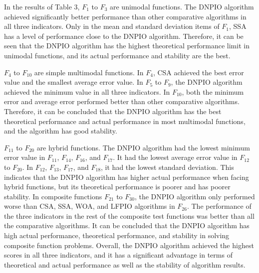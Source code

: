 \documentclass[preprint,review,compress,12pt]{elsarticle}
\begin{document}
In the results of Table 3, $F_1$ to $F_3$ are unimodal functions. The DNPIO algorithm achieved significantly better performance than other comparative algorithms in all three indicators. Only in the mean and standard deviation items of $F_1$, SSA has a level of performance close to the DNPIO algorithm. Therefore, it can be seen that the DNPIO algorithm has the highest theoretical performance limit in unimodal functions, and its actual performance and stability are the best.

$F_4$ to $F_{10}$ are simple multimodal functions. In $F_4$, CSA achieved the best error value and the smallest average error value. In $F_5$ to $F_9$, the DNPIO algorithm achieved the minimum value in all three indicators. In $F_{10}$, both the minimum error and average error performed better than other comparative algorithms. Therefore, it can be concluded that the DNPIO algorithm has the best theoretical performance and actual performance in most multimodal functions, and the algorithm has good stability.

$F_{11}$ to $F_{20}$ are hybrid functions. The DNPIO algorithm had the lowest minimum error value in $F_{11}$, $F_{14}$, $F_{16}$, and $F_{17}$. It had the lowest average error value in $F_{12}$ to $F_{20}$. In $F_{12}$, $F_{13}$, $F_{17}$, and $F_{18}$, it had the lowest standard deviation. This indicates that the DNPIO algorithm has higher actual performance when facing hybrid functions, but its theoretical performance is poorer and has poorer stability. In composite functions $F_{21}$ to $F_{30}$, the DNPIO algorithm only performed worse than CSA, SSA, WOA, and LFPIO algorithms in $F_{26}$. The performance of the three indicators in the rest of the composite test functions was better than all the comparative algorithms. It can be concluded that the DNPIO algorithm has high actual performance, theoretical performance, and stability in solving composite function problems. Overall, the DNPIO algorithm achieved the highest scores in all three indicators, and it has a significant advantage in terms of theoretical and actual performance as well as the stability of algorithm results.
\end{document}
